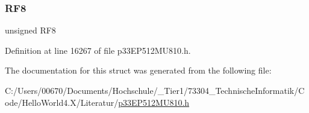 \mbox{\label{structtag_p_o_r_t_f_b_i_t_s_ad218b2653cd2cff74cc8524ffbb048d6}} 
\subsubsection{\texorpdfstring{R\+F8}{RF8}}
{\footnotesize\ttfamily unsigned R\+F8}



Definition at line 16267 of file p33\+E\+P512\+M\+U810.\+h.



The documentation for this struct was generated from the following file\+:\begin{DoxyCompactItemize}
\item 
C\+:/\+Users/00670/\+Documents/\+Hochschule/\+\_\+\+Tier1/73304\+\_\+\+Technische\+Informatik/\+Code/\+Hello\+World4.\+X/\+Literatur/\hyperlink{p33_e_p512_m_u810_8h}{p33\+E\+P512\+M\+U810.\+h}\end{DoxyCompactItemize}
